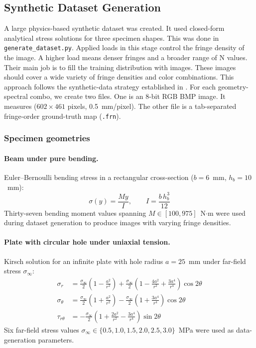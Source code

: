 \documentclass[review,12pt]{elsarticle}
\begin{document}
\subsection{Synthetic Dataset Generation}
\label{sec:synthetic}

A large physics-based synthetic dataset was created. It used closed-form analytical stress solutions for three specimen shapes. This was done in \texttt{generate\_dataset.py}. Applied loads in this stage control the fringe density of the image. A higher load means denser fringes and a broader range of N values. Their main job is to fill the training distribution with images. These images should cover a wide variety of fringe densities and color combinations. This approach follows the synthetic-data strategy established in \cite{mohan2024,brinezdeleon2024}. For each geometry-spectral combo, we create two files. One is an 8-bit RGB BMP image. It measures ($602 \times 461$ pixels,
0.5~mm/pixel). The other file is a tab-separated fringe-order ground-truth map (\texttt{.frn}).

\subsubsection{Specimen geometries}

\paragraph{Beam under pure bending.}
Euler--Bernoulli bending stress in a rectangular cross-section ($b = 6$~mm,
$h_b = 10$~mm):
\begin{equation}
  \sigma(y) = \frac{My}{I}, \qquad I = \frac{b\,h_b^3}{12}
  \label{eq:beam}
\end{equation}
Thirty-seven bending moment values spanning $M \in [100, 975]$~N$\cdot$m
were used during dataset generation to produce images with varying fringe
densities.

\paragraph{Plate with circular hole under uniaxial tension.}
Kirsch solution \cite{kirsch1898} for an infinite plate with hole radius
$a = 25$~mm under far-field stress $\sigma_\infty$:
\begin{align}
  \sigma_r    &= \frac{\sigma_\infty}{2}\!\left(1-\frac{a^2}{r^2}\right)
                 + \frac{\sigma_\infty}{2}\!\left(1-\frac{4a^2}{r^2}
                 + \frac{3a^4}{r^4}\right)\!\cos 2\theta \label{eq:kirsch_r}\\
  \sigma_\theta &= \frac{\sigma_\infty}{2}\!\left(1+\frac{a^2}{r^2}\right)
                 - \frac{\sigma_\infty}{2}\!\left(1+\frac{3a^4}{r^4}\right)
                 \!\cos 2\theta \label{eq:kirsch_theta}\\
  \tau_{r\theta} &= -\frac{\sigma_\infty}{2}\!\left(1+\frac{2a^2}{r^2}
                 - \frac{3a^4}{r^4}\right)\!\sin 2\theta \label{eq:kirsch_tau}
\end{align}
Six far-field stress values $\sigma_\infty \in \{0.5, 1.0, 1.5, 2.0, 2.5,
3.0\}$~MPa were used as data-generation parameters.
\end{document}
